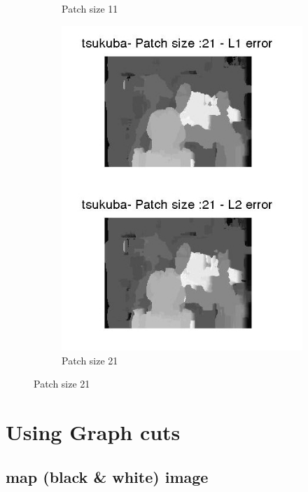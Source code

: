 \documentclass[fleqn]{article}
\begin{document}
\begin{figure}[!ht]
\begin{subfigure}{0.5\textwidth}
\caption{Patch size 11}
\end{subfigure}
 \begin{subfigure}{0.5\textwidth}
 \centering
\includegraphics[scale=0.3]{./pics/tsukuba_disparity_patchsize_21.jpg}
\caption{Patch size 21}
\end{subfigure}
\end{figure}

\newpage
\section{Using Graph cuts}
\subsection{map (black \& white) image}
\end{document}
